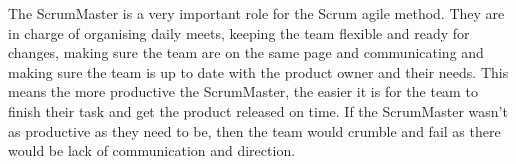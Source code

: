\documentclass{scrartcl}
\begin{document}
The ScrumMaster is a very important role for the Scrum agile method. They are in charge of organising daily meets, keeping the team flexible and ready for changes, making sure the team are on the same page and communicating and making sure the team is up to date with the product owner and their needs. This means the more productive the ScrumMaster, the easier it is for the team to finish their task and get the product released on time. If the ScrumMaster wasn’t as productive as they need to be, then the team would crumble and fail as there would be lack of communication and direction. 



\end{document}
